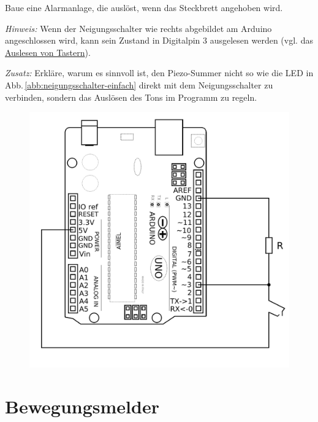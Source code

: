 \newpage
\begin{minipage}[t]{0.55\textwidth}
	\begin{projekt}[Alarmanlage]\label{proj:neigungsalarmanlage}
		Baue eine Alarmanlage, die auslöst, wenn das Steckbrett angehoben wird.
		
		\emph{Hinweis:} Wenn der Neigungsschalter wie rechts abgebildet am Arduino angeschlossen wird, kann sein Zustand in Digitalpin 3 ausgelesen werden (vgl. das \hyperref[abb:schaltplan-taster-pulldown]{Auslesen von Tastern}).
		
		\emph{Zusatz:} Erkläre, warum es sinnvoll ist, den Piezo-Summer nicht so wie die LED in Abb.\,\ref{abb:neigungsschalter-einfach} direkt mit dem Neigungsschalter zu verbinden, sondern das Auslösen des Tons im Programm zu regeln.
	\end{projekt}
\end{minipage}
\hfill
\begin{minipage}[t]{0.44\textwidth}
	\begin{figure}[H]
		\centering
		\includegraphics[width=\textwidth]{./Zeichnungen/neigungsschalter-mit-arduino.png}
	\end{figure}
\end{minipage}


\newpage
\section{Bewegungsmelder}
\label{sec:bewegungsmelder}

